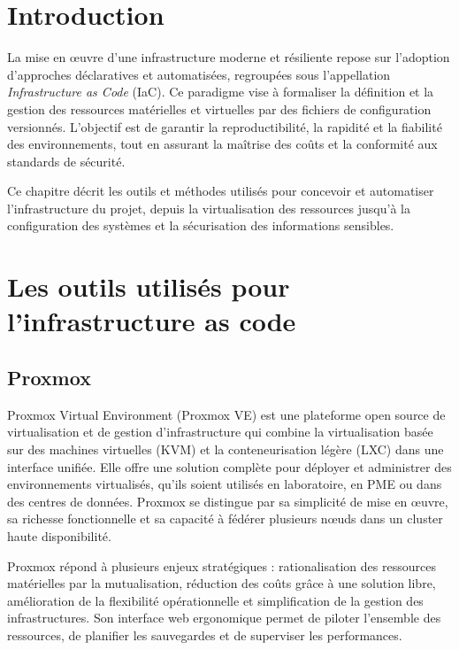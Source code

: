 \section{Introduction}

La mise en œuvre d’une infrastructure moderne et résiliente repose sur l’adoption d’approches déclaratives et automatisées, regroupées sous l’appellation \textit{Infrastructure as Code} (IaC). Ce paradigme vise à formaliser la définition et la gestion des ressources matérielles et virtuelles par des fichiers de configuration versionnés. L’objectif est de garantir la reproductibilité, la rapidité et la fiabilité des environnements, tout en assurant la maîtrise des coûts et la conformité aux standards de sécurité.

Ce chapitre décrit les outils et méthodes utilisés pour concevoir et automatiser l’infrastructure du projet, depuis la virtualisation des ressources jusqu’à la configuration des systèmes et la sécurisation des informations sensibles.

\section{Les outils utilisés pour l’infrastructure as code}

\subsection{Proxmox}

Proxmox Virtual Environment (Proxmox VE) est une plateforme open source de virtualisation et de gestion d’infrastructure qui combine la virtualisation basée sur des machines virtuelles (KVM) et la conteneurisation légère (LXC) dans une interface unifiée. Elle offre une solution complète pour déployer et administrer des environnements virtualisés, qu’ils soient utilisés en laboratoire, en PME ou dans des centres de données. Proxmox se distingue par sa simplicité de mise en œuvre, sa richesse fonctionnelle et sa capacité à fédérer plusieurs nœuds dans un cluster haute disponibilité.

Proxmox répond à plusieurs enjeux stratégiques : rationalisation des ressources matérielles par la mutualisation, réduction des coûts grâce à une solution libre, amélioration de la flexibilité opérationnelle et simplification de la gestion des infrastructures. Son interface web ergonomique permet de piloter l’ensemble des ressources, de planifier les sauvegardes et de superviser les performances.


